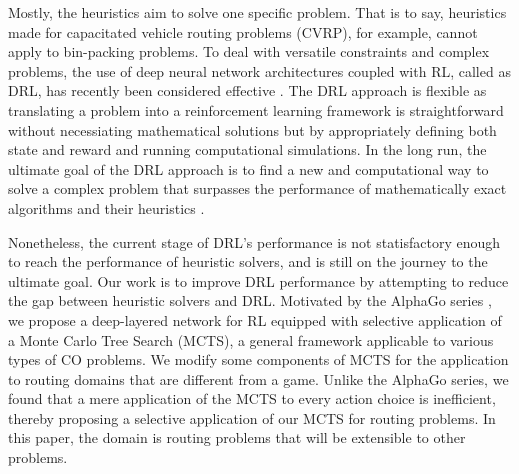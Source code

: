 \documentclass{article}
\begin{document}

Mostly, the heuristics aim to solve one specific problem. That is to say, heuristics made for capacitated vehicle routing problems (CVRP), for example, cannot apply to bin-packing problems. To deal with versatile constraints and complex problems, the use of deep neural network architectures coupled with RL, called as DRL, has recently been considered effective
\cite{kwonMatNet, kwonPOMOPolicyOptimization2021}. The DRL approach is flexible as translating a problem into a reinforcement learning framework is straightforward without necessiating mathematical solutions but by  appropriately defining both state and reward and running computational simulations.
In the long run, the ultimate goal of the DRL approach is to find a new and computational way to solve a complex problem that surpasses the performance of mathematically exact algorithms and their heuristics \cite{tensor_mult_RL}.


Nonetheless, the current stage of DRL's performance is not statisfactory enough to reach the performance of heuristic solvers, and is still on the journey to the ultimate goal. Our work is to improve DRL performance by attempting to reduce the gap between heuristic solvers and DRL. Motivated by the AlphaGo series \citep{silverMasteringGameGo2016, silverMasteringGameGo2017, schrittwieserMasteringAtariGo2020}, we propose a deep-layered network for RL equipped with selective application of a Monte Carlo Tree Search (MCTS), a general framework applicable to various types of CO problems. We modify some components of MCTS for the application to routing domains that are different from a game.
Unlike the AlphaGo series, we found that a mere application of the MCTS to every action choice is inefficient, thereby proposing a selective application of our MCTS for routing problems.
In this paper, the domain is routing problems that will be extensible to other problems.
\end{document}
